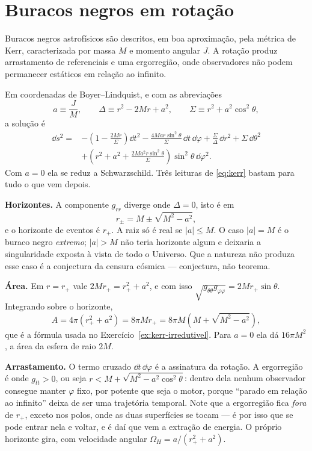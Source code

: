 \documentclass[12pt,a4paper,oneside]{book}
\theoremstyle{rgplain}
\theoremstyle{rgremark}
\begin{document}
\section{Buracos negros em rotação}

Buracos negros astrofísicos são descritos, em boa aproximação, pela métrica de
Kerr, caracterizada por massa $M$ e momento angular $J$. A rotação produz
arrastamento de referenciais e uma ergorregião, onde observadores não podem
permanecer estáticos em relação ao infinito.

Em coordenadas de Boyer--Lindquist, e com as abreviações
\[
  a\equiv\frac{J}{M},\qquad
  \Delta\equiv r^2-2Mr+a^2,\qquad
  \Sigma\equiv r^2+a^2\cos^2\theta,
\]
a solução é
\begin{equation}
\begin{split}
  \dd s^2={}&-\left(1-\frac{2Mr}{\Sigma}\right)\dd t^2
  -\frac{4Mar\sin^2\theta}{\Sigma}\,\dd t\,\dd\varphi
  +\frac{\Sigma}{\Delta}\,\dd r^2+\Sigma\,\dd\theta^2\\[2pt]
  &+\left(r^2+a^2+\frac{2Ma^2r\sin^2\theta}{\Sigma}\right)
    \sin^2\theta\,\dd\varphi^2 .
\end{split}
\label{eq:kerr}
\end{equation}
Com $a=0$ ela se reduz a Schwarzschild. Três leituras de \eqref{eq:kerr} bastam
para tudo o que vem depois.

\begin{etapas}
  \item \textbf{Horizontes.} A componente $g_{rr}$ diverge onde $\Delta=0$, isto
  é em
  \[
    r_\pm=M\pm\sqrt{M^2-a^2},
  \]
  e o horizonte de eventos é $r_+$. A raiz só é real se $|a|\le M$. O caso
  $|a|=M$ é o buraco negro \emph{extremo}; $|a|>M$ não teria horizonte algum e
  deixaria a singularidade exposta à vista de todo o Universo. Que a natureza
  não produza esse caso é a conjectura da censura cósmica --- conjectura, não
  teorema.

  \item \textbf{Área.} Em $r=r_+$ vale $2Mr_+=r_+^2+a^2$, e com isso
  $\sqrt{g_{\theta\theta}g_{\varphi\varphi}}=2Mr_+\sin\theta$. Integrando sobre
  o horizonte,
  \begin{equation}
    A=4\pi\left(r_+^2+a^2\right)=8\pi Mr_+
     =8\pi M\left(M+\sqrt{M^2-a^2}\right),
    \label{eq:area-kerr}
  \end{equation}
  que é a fórmula usada no Exercício~\ref{ex:kerr-irredutivel}. Para $a=0$ ela
  dá $16\pi M^2$, a área da esfera de raio $2M$.

  \item \textbf{Arrastamento.} O termo cruzado $\dd t\,\dd\varphi$ é a
  assinatura da rotação. A ergorregião é onde $g_{tt}>0$, ou seja
  $r<M+\sqrt{M^2-a^2\cos^2\theta}$: dentro dela nenhum observador consegue
  manter $\varphi$ fixo, por potente que seja o motor, porque ``parado em
  relação ao infinito'' deixa de ser uma trajetória temporal. Note que a
  ergorregião fica \emph{fora} de $r_+$, exceto nos polos, onde as duas
  superfícies se tocam --- é por isso que se pode entrar nela e voltar, e é daí
  que vem a extração de energia. O próprio horizonte gira, com velocidade
  angular $\Omega_H=a/(r_+^2+a^2)$.
\end{etapas}
\end{document}
